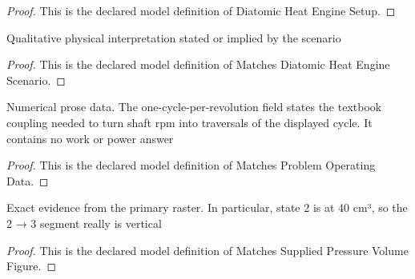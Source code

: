 \begin{proof}
  This is the declared model definition of Diatomic Heat Engine Setup.
\end{proof}
\begin{definition}
  \label{def:physics:phyx-mini-0426:phyxminiproblems-problemphyxmini0426-matchesdiatomicheatenginescenario}
  Qualitative physical interpretation stated or implied by the scenario
\end{definition}
\begin{proof}
  This is the declared model definition of Matches Diatomic Heat Engine Scenario.
\end{proof}
\begin{definition}
  \label{def:physics:phyx-mini-0426:phyxminiproblems-problemphyxmini0426-matchesproblemoperatingdata}
  Numerical prose data. The one-cycle-per-revolution field states the textbook coupling needed to turn shaft rpm into traversals of the displayed cycle. It contains no work or power answer
\end{definition}
\begin{proof}
  This is the declared model definition of Matches Problem Operating Data.
\end{proof}
\begin{definition}
  \label{def:physics:phyx-mini-0426:phyxminiproblems-problemphyxmini0426-matchessuppliedpressurevolumefigure}
  Exact evidence from the primary raster. In particular, state 2 is at 40 cm³, so the 2 → 3 segment really is vertical
\end{definition}
\begin{proof}
  This is the declared model definition of Matches Supplied Pressure Volume Figure.
\end{proof}
